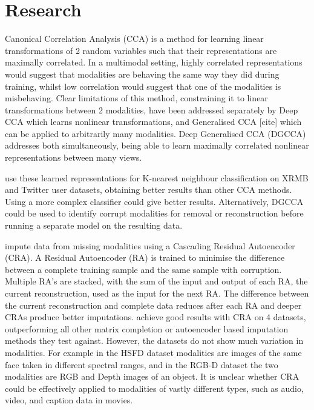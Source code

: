 \chapter{Research}

Canonical Correlation Analysis (CCA) is a method for learning linear transformations of 2 random variables such that their representations are maximally correlated. In a multimodal setting, highly correlated representations would suggest that modalities are behaving the same way they did during training, whilst low correlation would suggest that one of the modalities is misbehaving. Clear limitations of this method, constraining it to linear transformations between 2 modalities, have been addressed separately by Deep CCA \cite{DCCA} which learns nonlinear transformations, and Generalised CCA [cite] which can be applied to arbitrarily many modalities. Deep Generalised CCA (DGCCA) \cite{DGCCA} addresses both simultaneously, being able to learn maximally correlated nonlinear representations between many views.

\cite{DGCCA} use these learned representations for K-nearest neighbour classification on XRMB and Twitter user datasets, obtaining better results than other CCA methods. Using a more complex classifier could give better results. Alternatively, DGCCA could be used to identify corrupt modalities for removal or reconstruction before running a separate model on the resulting data.

\cite{CRA} impute data from missing modalities using a Cascading Residual Autoencoder (CRA). A Residual Autoencoder (RA) is trained to minimise the difference between a complete training sample and the same sample with corruption. Multiple RA’s are stacked, with the sum of the input and output of each RA, the current reconstruction, used as the input for the next RA. The difference between the current reconstruction and complete data reduces after each RA and deeper CRAs produce better imputations.
\cite{CRA} achieve good results with CRA on 4 datasets, outperforming all other matrix completion or autoencoder based imputation methods they test against. However, the datasets do not show much variation in modalities. For example in the HSFD dataset modalities are images of the same face taken in different spectral ranges, and in the RGB-D dataset the two modalities are RGB and Depth images of an object. It is unclear whether CRA could be effectively applied to modalities of vastly different types, such as audio, video, and caption data in movies.


